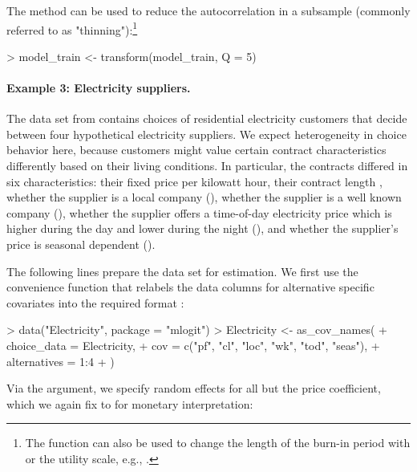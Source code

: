 \documentclass[article,shortnames]{jss}
\newcommand{\fct}[1]{\code{#1()}}
\begin{document}
The \fct{transform} method can be used to reduce the autocorrelation in a subsample (commonly referred to as "thinning"):\footnote{The function can also be used to change the length of the burn-in period with  or the utility scale, e.g., .}

\begin{Schunk}
\begin{Sinput}
> model_train <- transform(model_train, Q = 5)
\end{Sinput}
\end{Schunk}

\paragraph{Example 3: Electricity suppliers.}

The  data set from  contains choices of residential electricity customers that decide between four hypothetical electricity suppliers. We expect heterogeneity in choice behavior here, because customers might value certain contract characteristics differently based on their living conditions. In particular, the contracts differed in six characteristics: their fixed price  per kilowatt hour, their contract length , whether the supplier is a local company (), whether the supplier is a well known company (), whether the supplier offers a time-of-day electricity price which is higher during the day and lower during the night (), and whether the supplier's price is seasonal dependent ().

The following lines prepare the data set for estimation. We first use the convenience function \fct{as\_cov\_names} that relabels the data columns for alternative specific covariates into the required format :
\enlargethispage{\baselineskip}

\begin{Schunk}
\begin{Sinput}
> data("Electricity", package = "mlogit")
> Electricity <- as_cov_names(
+    choice_data = Electricity,
+    cov = c("pf", "cl", "loc", "wk", "tod", "seas"),
+    alternatives = 1:4
+  )
\end{Sinput}
\end{Schunk}

Via the  argument, we specify random effects for all but the price coefficient, which we again fix to  for monetary interpretation:
\end{document}
